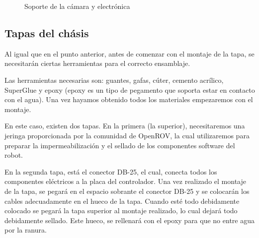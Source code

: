\begin{figure}[hbtp]
  \begin{center}
  \end{center}
  \caption{Soporte de la cámara y electrónica}
  \label{fig:ROV-chasis}
\end{figure}

\subsection{Tapas del chásis}
\label{subsec:tapasChasis}

Al igual  que en el punto anterior, antes de comenzar con el montaje de la tapa, se necesitarán ciertas herramientas para el correcto ensamblaje.

Las herramientas necesarias son: guantes, gafas, cúter, cemento acrílico,  SuperGlue y epoxy (epoxy es un tipo de pegamento que soporta estar en contacto con el agua). Una vez hayamos obtenido todos los materiales empezaremos con el montaje.

En este caso, existen dos tapas. En la primera (la superior), necesitaremos una jeringa proporcionada por la comunidad de OpenROV, la cual utilizaremos para preparar la impermeabilización y el sellado de los componentes software del robot.

En la segunda tapa, está el conector DB-25, el cual, conecta todos los componentes eléctricos a la placa del controlador. Una vez realizado el montaje de la tapa, se pegará en el espacio sobrante el conector DB-25 y se colocarán los cables adecuadamente en el hueco de la tapa. Cuando esté todo debidamente colocado se pegará la tapa superior al montaje realizado, lo cual dejará todo debidamente sellado. Este hueco, se rellenará con el epoxy para que no entre agua por la ranura.

